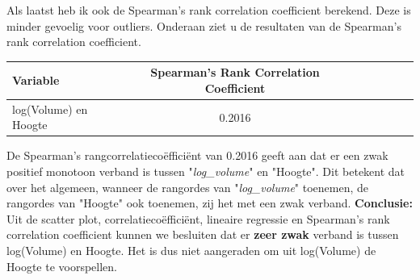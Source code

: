 \documentclass[12pt]{article}
\begin{document}
\newline\newline
Als laatst heb ik ook de Spearman's rank correlation coefficient berekend.
Deze is minder gevoelig voor outliers.
Onderaan ziet u de resultaten van de Spearman's rank correlation coefficient.
\newline\newline\newline
\begin{tabular}{l*{6}{c}r}
    Variable & Spearman's Rank Correlation Coefficient \\
    \hline
    log(Volume) en Hoogte & 0.2016 \\
\end{tabular}
\newline\newline\newline
De Spearman's rangcorrelatiecoëfficiënt van 0.2016 geeft aan dat er een zwak positief monotoon verband is tussen "\textit{log\_volume}" en "Hoogte". 
Dit betekent dat over het algemeen, wanneer de rangordes van "\textit{log\_volume}" toenemen, de rangordes van "Hoogte" ook toenemen, zij het met een zwak verband.
\newline\newline
\textbf{Conclusie:} Uit de scatter plot, correlatiecoëfficiënt, lineaire regressie en Spearman's rank correlation coefficient kunnen we besluiten dat er \textbf{zeer zwak} verband is tussen log(Volume) en Hoogte.
Het is dus niet aangeraden om uit log(Volume) de Hoogte te voorspellen.
\end{document}
